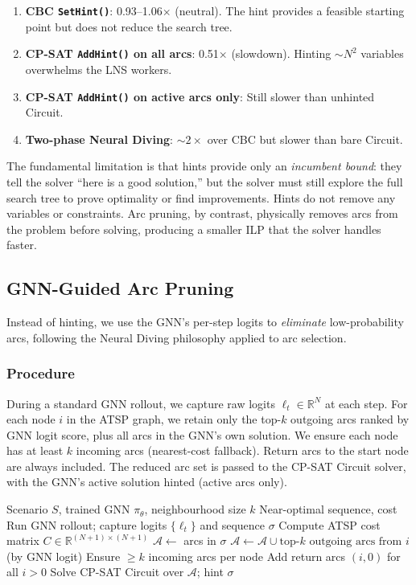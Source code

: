 \documentclass[conference]{IEEEtran}
\begin{document}
\begin{enumerate}
\item \textbf{CBC \texttt{SetHint()}}: 0.93--1.06$\times$ (neutral). The hint provides a feasible starting point but does not reduce the search tree.
\item \textbf{CP-SAT \texttt{AddHint()} on all arcs}: 0.51$\times$ (slowdown). Hinting ${\sim}N^2$ variables overwhelms the LNS workers.
\item \textbf{CP-SAT \texttt{AddHint()} on active arcs only}: Still slower than unhinted Circuit.
\item \textbf{Two-phase Neural Diving}: ${\sim}2\times$ over CBC but slower than bare Circuit.
\end{enumerate}

The fundamental limitation is that hints provide only an \emph{incumbent bound}: they tell the solver ``here is a good solution,'' but the solver must still explore the full search tree to prove optimality or find improvements. Hints do not remove any variables or constraints. Arc pruning, by contrast, physically removes arcs from the problem before solving, producing a smaller ILP that the solver handles faster.

\subsection{GNN-Guided Arc Pruning}

Instead of hinting, we use the GNN's per-step logits to \emph{eliminate} low-probability arcs, following the Neural Diving philosophy \cite{nair2021neural} applied to arc selection.

\subsubsection{Procedure} During a standard GNN rollout, we capture raw logits $\ell_t \in \mathbb{R}^N$ at each step. For each node $i$ in the ATSP graph, we retain only the top-$k$ outgoing arcs ranked by GNN logit score, plus all arcs in the GNN's own solution. We ensure each node has at least $k$ incoming arcs (nearest-cost fallback). Return arcs to the start node are always included. The reduced arc set is passed to the CP-SAT Circuit solver, with the GNN's active solution hinted (active arcs only).

\begin{algorithm}[htbp]
\caption{GNN-Guided Arc Pruning}
\label{alg:pruned}
\begin{algorithmic}[1]
\REQUIRE Scenario $S$, trained GNN $\pi_\theta$, neighbourhood size $k$
\ENSURE Near-optimal sequence, cost
\STATE Run GNN rollout; capture logits $\{\ell_t\}$ and sequence $\sigma$
\STATE Compute ATSP cost matrix $C \in \mathbb{R}^{(N+1)\times(N+1)}$
\STATE $\mathcal{A} \leftarrow$ arcs in $\sigma$
    \STATE $\mathcal{A} \leftarrow \mathcal{A} \cup \text{top-}k\text{ outgoing arcs from } i$ (by GNN logit)
\ENDFOR
\STATE Ensure $\geq k$ incoming arcs per node
\STATE Add return arcs $(i, 0)$ for all $i > 0$
\STATE Solve CP-SAT Circuit over $\mathcal{A}$; hint $\sigma$
\end{algorithmic}
\end{algorithm}
\end{document}
